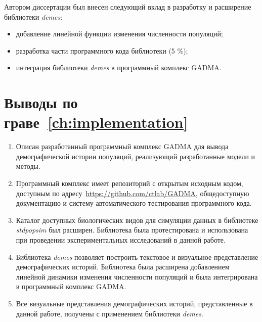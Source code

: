 Автором диссертации был внесен следующий вклад в разработку и расширение библиотеки \textit{demes}:
\begin{itemize}
    \item добавление линейной функции изменения численности популяций;
    \item разработка части программного кода библиотеки (5 \%);
    \item интеграция библиотеки \textit{demes} в программный комплекс GADMA.
\end{itemize}


\section*{Выводы по граве~\ref{ch:implementation}}

\begin{enumerate}[label={\arabic*.}]
    \item Описан разработанный программный комплекс GADMA для вывода демографической истории популяций, реализующий разработанные модели и методы. 
    \item Программный комплекс имеет репозиторий с открытым исходным кодом, доступным по адресу~\url{https://github.com/ctlab/GADMA}, общедоступную документацию и систему автоматического тестирования программного кода.
    \item Каталог доступных биологических видов для симуляции данных в библиотеке \textit{stdpopsim} был расширен. Библиотека была протестирована и использована при проведении экспериментальных исследований в данной работе.
    \item Библиотека \textit{demes} позволяет построить текстовое и визуальное представление демографических историй. Библиотека была расширена добавлением линейной динамики изменения численности популяций и была интегрирована в программный комплекс GADMA.
    \item Все визуальные представления демографических историй, представленные в данной работе, получены с применением библиотеки \textit{demes}.
\end{enumerate}